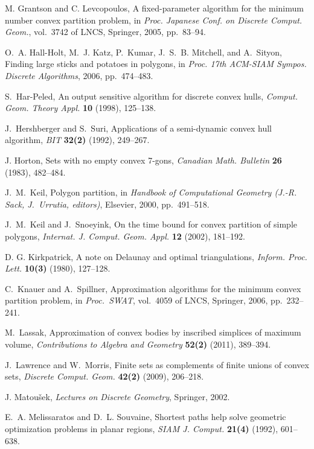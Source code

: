 \documentclass[11pt]{article}
\begin{document}
\begin{thebibliography}{99}
M. Grantson and C. Levcopoulos,
A fixed-parameter algorithm for the minimum number convex partition problem,
in \emph{Proc. Japanese Conf. on Discrete Comput. Geom.}, vol.~3742 of
LNCS, Springer, 2005, pp.~83--94.

O.~A. Hall-Holt, M.~J. Katz, P.~Kumar, J.~S.~B. Mitchell, and A.~Sityon,
Finding large sticks and potatoes in polygons,
in \emph{Proc. 17th ACM-SIAM Sympos. Discrete Algorithms},
2006, pp.~474--483.

S.~Har-Peled,
An output sensitive algorithm for discrete convex hulls,
\emph{Comput. Geom. Theory Appl.} \textbf{10} (1998), 125--138.

J.~Hershberger and S.~Suri,
Applications of a semi-dynamic convex hull algorithm,
\emph{BIT} \textbf{32(2)} (1992), 249--267.

J. Horton,
Sets with no empty convex 7-gons,
\emph{Canadian Math. Bulletin} \textbf{26} (1983), 482--484.

J.~M.~Keil,
Polygon partition, in
\emph{Handbook of Computational Geometry (J.-R. Sack, J.~Urrutia, editors)},
Elsevier, 2000, pp.~491--518.

J.~M.~Keil and J.~Snoeyink, On the time bound for convex partition
of simple polygons,
\emph{Internat. J. Comput. Geom. Appl.} \textbf{12} (2002), 181--192.

D. G. Kirkpatrick, A note on Delaunay and optimal triangulations,
\emph{Inform. Proc. Lett.} \textbf{10(3)} (1980), 127--128.

C.~Knauer and A.~Spillner,
Approximation algorithms for the minimum convex partition problem,
in \emph{Proc.~SWAT}, vol.~4059 of LNCS, Springer, 2006, pp.~232--241.

M.~Lassak,
Approximation of convex bodies by inscribed simplices of maximum volume,
\emph{Contributions to Algebra and Geometry} \textbf{52(2)} (2011), 389--394.

J.~Lawrence and W.~Morris,
Finite sets as complements of finite unions of convex sets,
\emph{Discrete Comput. Geom.} \textbf{42(2)} (2009), 206--218.


J. Matou\v{s}ek,
\emph{Lectures on Discrete Geometry}, Springer, 2002.

E.~A. Melissaratos and D.~L. Souvaine,
Shortest paths help solve geometric optimization problems in planar regions,
\emph{SIAM J. Comput.} \textbf{21(4)} (1992), 601--638.


\end{thebibliography}
\end{document}
